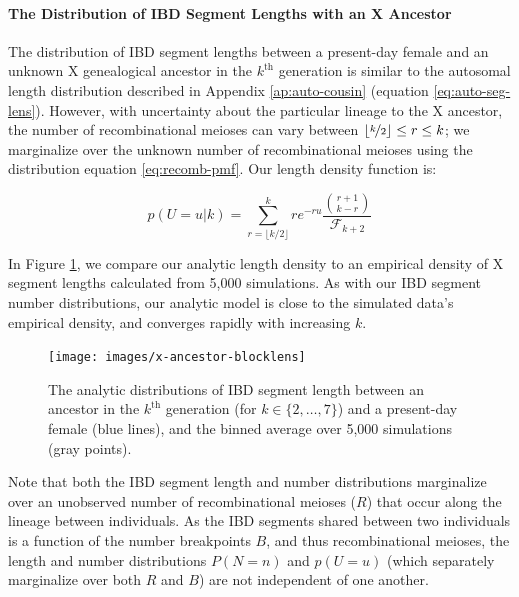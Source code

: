 \documentclass[11pt]{article}
\begin{document}
\paragraph{The Distribution of IBD Segment Lengths with an X Ancestor}

The distribution of IBD segment lengths between a present-day female and an
unknown X genealogical ancestor in the $k^\text{th}$ generation is similar to
the autosomal length distribution described in Appendix \ref{ap:auto-cousin}
(equation \ref{eq:auto-seg-lens}). However, with uncertainty about the
particular lineage to the X ancestor, the number of recombinational meioses can
vary between $\lfloor \nicefrac{k}{2} \rfloor \le r \le k$; we marginalize over
the unknown number of recombinational meioses using the distribution equation
\eqref{eq:recomb-pmf}. Our length density function is:

\begin{equation}
  \label{eq:x-anc-length}
  p(U = u | k) = \sum_{r=\lfloor k/2 \rfloor}^k  r e^{-ru} \frac{{r+1 \choose k-r}}{\mathcal{F}_{k+2}} 
\end{equation}

In Figure \ref{fig:x-len-dist}, we compare our analytic length density to an
empirical density of X segment lengths calculated from 5,000 simulations. As
with our IBD segment number distributions, our analytic model is close to the
simulated data's empirical density, and converges rapidly with increasing $k$.

\begin{figure}[!ht]
  \centering
  \texttt{[image: images/x-ancestor-blocklens]}

  \caption{The analytic distributions of IBD segment length between an ancestor
  in the $k^\text{th}$ generation (for $k \in \{2, \ldots, 7\}$) and a
  present-day female (blue lines), and the binned average over 5,000
  simulations (gray points).}

  \label{fig:x-len-dist}
\end{figure}

Note that both the IBD segment length and number distributions marginalize over
an unobserved number of recombinational meioses ($R$) that occur along the
lineage between individuals. As the IBD segments shared between two individuals
is a function of the number breakpoints $B$, and thus recombinational meioses,
the length and number distributions $P(N = n)$ and $p(U = u)$ (which separately
marginalize over both $R$ and $B$) are not independent of one another.
\end{document}
